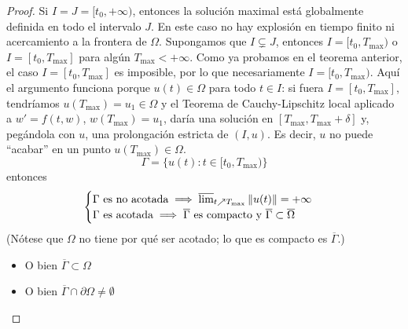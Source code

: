 \begin{proof}
    Si $I = J = [t_0, +\infty)$, entonces la solución maximal está globalmente definida en todo el intervalo $J$. En este caso no hay explosión en tiempo finito ni acercamiento a la frontera de $\Omega$.
    Supongamos que $I \subsetneq J$, entonces $I = [t_0, T_{\text{max}})$ o $I = [t_0, T_{\text{max}}]$ para algún $T_{\text{max}} < +\infty$. Como ya probamos en el teorema anterior, el caso $I = [t_0, T_{\text{max}}]$ es imposible, por lo que necesariamente $I = [t_0, T_{\text{max}})$. Aquí el argumento funciona porque $u(t) \in \Omega$ para todo $t \in I$: si fuera $I = [t_0, T_{\text{max}}]$, tendríamos $u(T_{\text{max}}) = u_1 \in \Omega$ y el Teorema de Cauchy-Lipschitz local aplicado a $w' = f(t, w)$, $w(T_{\text{max}}) = u_1$, daría una solución en $[T_{\text{max}}, T_{\text{max}} + \delta]$ y, pegándola con $u$, una prolongación estricta de $(I, u)$. Es decir, $u$ no puede ``acabar'' en un punto $u(T_{\text{max}}) \in \Omega$.
    \[
        \Gamma = \{ u(t) : t \in [t_0, T_{\text{max}}) \}
    \]
    entonces
    \[
        \begin{cases}
            \Gamma \text{ es no acotada} \implies \varlimsup_{t \nearrow T_{\text{max}}} \| u(t) \| = +\infty \\
            \Gamma \text{ es acotada} \implies \overline{\Gamma} \text{ es compacto y } \overline{\Gamma} \subset \overline{\Omega}
        \end{cases}
    \]
    (Nótese que $\Omega$ no tiene por qué ser acotado; lo que es compacto es $\overline{\Gamma}$.)
    \begin{itemize}
        \item O bien $\overline{\Gamma} \subset \Omega$ \item O bien $\overline{\Gamma} \cap \partial \Omega \neq \emptyset$
    \end{itemize}


\end{proof}
